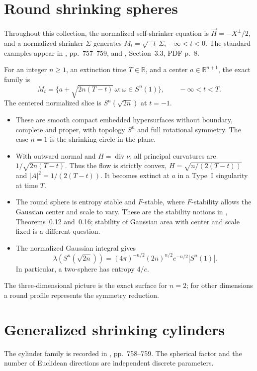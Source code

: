 \chapter{Round shrinking spheres}\label{sec:catalogue-round-sphere}
Throughout this collection, the normalized self-shrinker equation is
$\vec H=-X^\perp/2$, and a normalized shrinker $\Sigma$ generates
$M_t=\sqrt{-t}\,\Sigma$, $-\infty<t<0$.
The standard examples appear in \cite{CM12}, pp.~757--759, and
\cite{CatDLN2018}, Section~3.3, PDF p.~8.

\begin{example}\label{ex:catalogue-round-sphere}
For an integer $n\geq1$, an extinction time $T\in\mathbb R$, and a center
$a\in\mathbb R^{n+1}$, the exact family is
\[
 M_t=\{a+\sqrt{2n(T-t)}\,\omega:\omega\in S^n(1)\},
 \qquad -\infty<t<T.
\]
The centered normalized slice is $S^n(\sqrt{2n})$ at $t=-1$.
\begin{itemize}
\item These are smooth compact embedded hypersurfaces without boundary,
complete and proper, with topology $S^n$ and full rotational symmetry.
The case $n=1$ is the shrinking circle in the plane.
\item With outward normal and $H=\operatorname{div}\nu$, all principal
curvatures are $1/\sqrt{2n(T-t)}$. Thus the flow is strictly convex,
$H=\sqrt{n/(2(T-t))}$ and $|A|^2=1/(2(T-t))$.
It becomes extinct at $a$ in a Type~I singularity at time $T$.
\item The round sphere is entropy stable and $F$-stable, where $F$-stability
allows the Gaussian center and scale to vary. These are the stability
notions in \cite{CM12}, Theorems~0.12 and~0.16; stability of Gaussian
area with center and scale fixed is a different question.
\item The normalized Gaussian integral gives
\[
 \lambda(S^n(\sqrt{2n}))
 =(4\pi)^{-n/2}(2n)^{n/2}e^{-n/2}|S^n(1)|.
\]
In particular, a two-sphere has entropy $4/e$.
\end{itemize}
The three-dimensional picture is the exact surface for $n=2$; for other
dimensions a round profile represents the symmetry reduction.
\end{example}

\chapter{Generalized shrinking cylinders}\label{sec:catalogue-round-cylinder}
The cylinder family is recorded in \cite{CM12}, pp.~758--759.
The spherical factor and the number of Euclidean directions are independent
discrete parameters.

